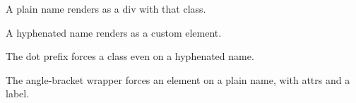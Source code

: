 \begin{note}
A plain name renders as a div with that class.
\end{note}

\begin{pull-quote}
A hyphenated name renders as a custom element.
\end{pull-quote}

\begin{side-bar}
The dot prefix forces a class even on a hyphenated name.
\end{side-bar}

\begin{aside}[Note]
The angle-bracket wrapper forces an element on a plain name, with attrs and a label.
\end{aside}

